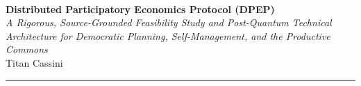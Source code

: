 \documentclass[10pt,twoside,openany]{book}
\theoremstyle{dpepstyle}
\begin{document}

\thispagestyle{empty}
\noindent{\footnotesize\scshape\bfseries\textcolor{CrimsonAccent}{Post-Capitalist Labs Imprint $\cdot$ Open-Source Research Monograph Series}}\\[0.35em]
{\Large\bfseries\color{NavyPrimary} Distributed Participatory Economics Protocol (DPEP)}\\[0.25em]
{\normalsize\itshape\color{SlateDark} A Rigorous, Source-Grounded Feasibility Study and Post-Quantum Technical Architecture for Democratic Planning, Self-Management, and the Productive Commons}\\[0.4em]
{\normalsize\color{NavyPrimary} Titan Cassini}\\[0.5em]
\rule{\textwidth}{0.6pt}\\[0.8em]
\end{document}
